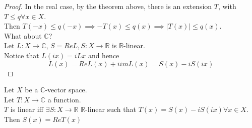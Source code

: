 \documentclass[../main.tex]{subfiles}
\begin{document}
\begin{proof}
	In the real case, by the theorem above, there is an extension $T$, with $T \leq q\forall x \in X$.\\
	Then $T( -x) \leq  q( -x) \implies - T( x) \leq  q( x) \implies |T( x) | \leq q( x) $.\\
	What about $\mathbb{C}$?\\
	Let $L:X\to \mathbb{C}$, $S= Re L, S:X\to \mathbb{R}$ is $ \mathbb{R}$-linear.\\
	Notice that $L( ix) = i Lx$ and hence
	\[ 
	L( x) = Re L( x) + i im L( x) = S( x) - i S( ix) 
	\]
\end{proof}
\begin{lemma}
Let $X$ be a $ \mathbb{C}$-vector space.\\
Let $T: X \to \mathbb{C}$ a function.\\
$T$ is linear iff $\exists S:X\to \mathbb{R}$ $ \mathbb{R}$-linear such that $T( x) = S( x) - i S( ix) \forall x \in X$.\\
Then $S( x) = Re T( x) $ 
\end{lemma}
\end{document}
